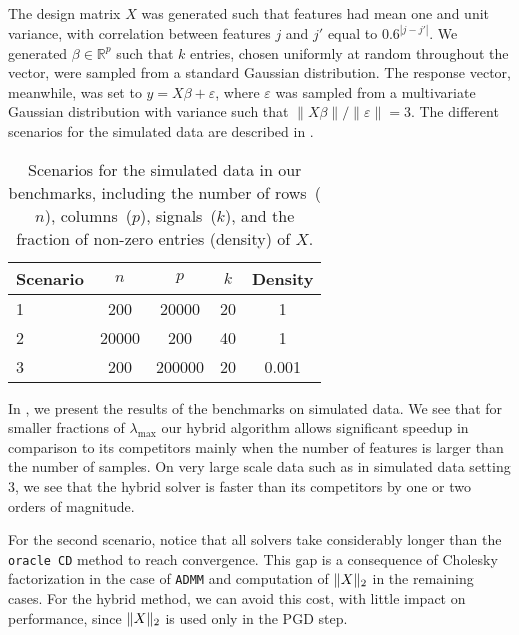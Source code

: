 The design matrix $X$ was generated such that features had mean one and unit variance, with correlation between features $j$ and $j'$ equal to $0.6^{|j-j'|}$.
We generated \(\beta \in \mathbb{R}^p\) such that \(k\) entries, chosen uniformly at random throughout the vector, were sampled from a standard Gaussian distribution.
The response vector, meanwhile, was set to $y=X\beta + \varepsilon$, where
$\varepsilon$ was sampled from a multivariate Gaussian distribution with variance such that $\lVert X\beta\rVert / \lVert \varepsilon \rVert = 3$.
The different scenarios for the simulated data are described in .

\begin{table}[hbt]
  \centering
  \caption{Scenarios for the simulated data in our benchmarks, including 
    the number of rows~(\(n\)), columns~(\(p\)), signals~(\(k\)), and the
    fraction of non-zero entries (density) of \(X\).}
  \label{tab:simulated-data}
  \begin{tabular}{
      l
      S[table-format=5.0,round-mode=off]
      S[table-format=7.0,round-mode=off]
      S[table-format=2.0,round-mode=off]
      S[table-format=1.3,round-mode=off]
    }
    \toprule
    {Scenario} & {\(n\)} & {\(p\)} & {\(k\)} & {Density} \\           & 200     & 20000   & 20      & 1         \\
    2          & 20000   & 200     & 40      & 1         \\
    3          & 200     & 200000  & 20      & 0.001     \\ \bottomrule
  \end{tabular}
\end{table}

In , we present the results of the benchmarks on simulated data.
We see that for smaller fractions of $\lambda_{\text{max}}$ our hybrid algorithm allows significant speedup in comparison to its competitors mainly when the number of features is larger than the number of samples.
On very large scale data such as in simulated data setting $3$, we see that the hybrid solver is faster than its competitors by one or two orders of magnitude.


For the second scenario, notice that all solvers take considerably longer than the \texttt{oracle CD} method to reach convergence.
This gap is a consequence of Cholesky factorization in the case of \texttt{ADMM} and computation of \(\lVert {X} \rVert_2\) in the remaining cases.
For the hybrid method, we can avoid this cost, with little impact on performance, since \(\lVert {X} \rVert_2\) is used only in the PGD step.

